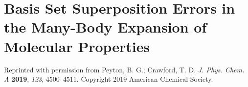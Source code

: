 \chapter{Basis Set Superposition Errors in the Many-Body Expansion of Molecular Properties} \label{ch:p1}
Reprinted with permission from Peyton, B. G.; Crawford, T. D. \textit{J. Phys. Chem. A} \textbf{2019}, \textit{123}, 4500–4511. Copyright 2019 American Chemical Society.




